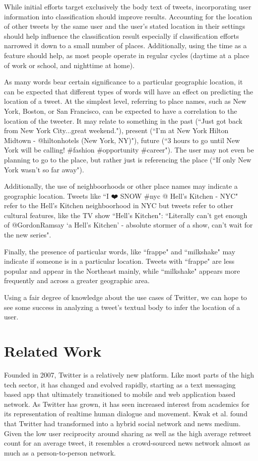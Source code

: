 \documentclass[midd]{thesis}
\begin{document}
While initial efforts target exclusively the body text of tweets, incorporating user information into classification should improve results. Accounting for the location of other tweets by the same user and the user's stated location in their settings should help influence the classification result especially if classification efforts narrowed it down to a small number of places. Additionally, using the time as a feature should help, as most people operate in regular cycles (daytime at a place of work or school, and nighttime at home).

As many words bear certain significance to a particular geographic location, it can be expected that different types of words will have an effect on predicting the location of a tweet. At the simplest level, referring to place names, such as New York, Boston, or San Francisco, can be expected to have a correlation to the location of the tweeter. It may relate to something in the past (``Just got back from New York City...great weekend."), present (``I'm at New York Hilton Midtown - @hiltonhotels (New York, NY)"), future (``3 hours to go until New York will be calling! \#fashion \#opportunity \#career"). The user may not even be planning to go to the place, but rather just is referencing the place (``If only New York wasn't so far away").

Additionally, the use of neighboorhoods or other place names may indicate a geographic location. Tweets like ``I ❤️ SNOW \#nyc @ Hell's Kitchen - NYC" refer to the Hell's Kitchen neighboorhood in NYC but tweets refer to other cultural features, like the TV show ``Hell's Kitchen": ``Literally can't get enough of @GordonRamsay `a Hell's Kitchen' - absolute stormer of a show, can't wait for the new series".

Finally, the presence of particular words, like ``frappe" and ``milkshake" may indicate if someone is in a particular location. Tweets with ``frappe" are less popular and appear in the Northeast mainly, while ``milkshake" appears more frequently and across a greater geographic area.

Using a fair degree of knowledge about the use cases of Twitter, we can hope to see some success in analyzing a tweet's textual body to infer the location of a user.

\chapter{Related Work}

Founded in 2007, Twitter is a relatively new platform. Like most parts of the high tech sector, it has changed and evolved rapidly, starting as a text messaging based app that ultimately transitioned to mobile and web application based network. As Twitter has grown, it has seen increased interest from academics for its representation of realtime human dialogue and movement. Kwak et al. \cite{kwak2010twitter} found that Twitter had transformed into a hybrid social network and news medium. Given the low user reciprocity around sharing as well as the high average retweet count for an average tweet, it resembles a crowd-sourced news network almost as much as a person-to-person network.
\end{document}
